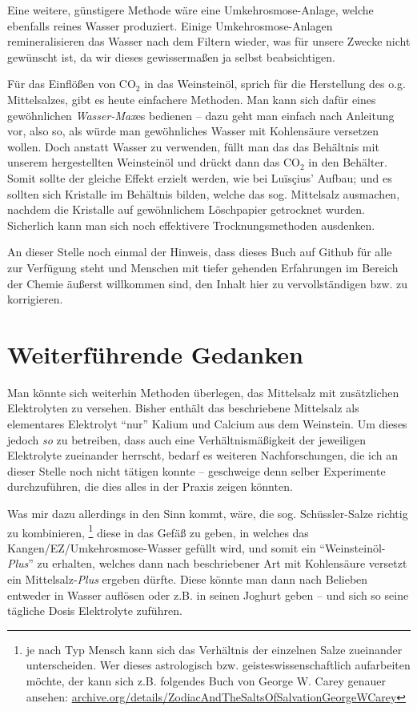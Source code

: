 \documentclass[a5paper,fontsize=10pt]{memoir}
\begin{document}
Eine weitere, günstigere Methode wäre eine Umkehrosmose-Anlage, 
welche ebenfalls reines Wasser produziert. 
Einige Umkehrosmose-Anlagen remineralisieren das Wasser nach dem Filtern wieder, 
was für unsere Zwecke nicht gewünscht ist, 
da wir dieses gewissermaßen ja selbst beabsichtigen.

Für das Einflößen von CO$_2$ in das Weinsteinöl, 
sprich für die Herstellung des o.g. Mittelsalzes, 
gibt es heute einfachere Methoden. 
Man kann sich dafür eines gewöhnlichen \emph{Wasser-Max}es bedienen 
-- dazu geht man einfach nach Anleitung vor, 
also so, als würde man gewöhnliches Wasser mit Kohlensäure versetzen wollen. 
Doch anstatt Wasser zu verwenden, 
füllt man das das Behältnis mit unserem hergestellten Weinsteinöl 
und drückt dann das CO$_2$ in den Behälter. 
Somit sollte der gleiche Effekt erzielt werden, wie bei Luïsçius' Aufbau; 
und es sollten sich Kristalle im Behältnis bilden, 
welche das sog. Mittelsalz ausmachen, 
nachdem die Kristalle auf gewöhnlichem Löschpapier getrocknet wurden. 
Sicherlich kann man sich noch effektivere Trocknungsmethoden ausdenken.

An dieser Stelle noch einmal der Hinweis, dass dieses
Buch auf Github für alle zur Verfügung steht und
Menschen mit tiefer gehenden Erfahrungen
im Bereich der Chemie äußerst willkommen sind,
den Inhalt hier zu vervollständigen bzw. zu korrigieren.


\section{Weiterführende Gedanken}

Man könnte sich weiterhin Methoden überlegen, 
das Mittelsalz mit zusätzlichen Elektrolyten zu versehen. 
Bisher enthält das beschriebene Mittelsalz 
als elementares Elektrolyt 
``nur'' Kalium und Calcium aus dem Weinstein. 
Um dieses jedoch \emph{so} zu betreiben, 
dass auch eine Verhältnismäßigkeit 
der jeweiligen Elektrolyte zueinander herrscht, 
bedarf es weiteren Nachforschungen, 
die ich an dieser Stelle noch nicht tätigen konnte 
-- geschweige denn selber Experimente durchzuführen, 
die dies alles in der Praxis zeigen könnten.

Was mir dazu allerdings in den Sinn kommt, wäre, 
die sog. Schüssler-Salze richtig zu kombinieren,%
\footnote{je nach Typ Mensch kann sich das Verhältnis 
der einzelnen Salze zueinander unterscheiden. 
Wer dieses astrologisch bzw. geisteswissenschaftlich aufarbeiten möchte, 
der kann sich z.B. folgendes Buch von George W. Carey genauer ansehen: 
\href{https://archive.org/details/ZodiacAndTheSaltsOfSalvationGeorgeWCarey}{archive.org/details/ZodiacAndTheSaltsOfSalvationGeorgeWCarey}}
diese in das Gefäß zu geben, 
in welches das Kangen/EZ/Umkehrosmose-Wasser gefüllt wird, 
und somit ein ``Weinsteinöl-\emph{Plus}'' zu erhalten, 
welches dann nach beschriebener Art mit Kohlensäure versetzt 
ein Mittelsalz-\emph{Plus} ergeben dürfte. 
Diese könnte man dann nach Belieben entweder in Wasser auflösen 
oder z.B. in seinen Joghurt geben 
-- und sich so seine tägliche Dosis Elektrolyte zuführen.
\end{document}
